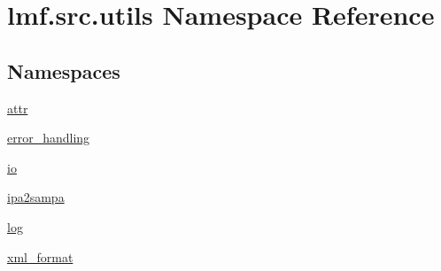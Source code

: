 \hypertarget{namespacelmf_1_1src_1_1utils}{\section{lmf.\+src.\+utils Namespace Reference}
\label{namespacelmf_1_1src_1_1utils}
}
\subsection*{Namespaces}
\begin{DoxyCompactItemize}
\item 
 \hyperlink{namespacelmf_1_1src_1_1utils_1_1attr}{attr}
\item 
 \hyperlink{namespacelmf_1_1src_1_1utils_1_1error__handling}{error\+\_\+handling}
\item 
 \hyperlink{namespacelmf_1_1src_1_1utils_1_1io}{io}
\item 
 \hyperlink{namespacelmf_1_1src_1_1utils_1_1ipa2sampa}{ipa2sampa}
\item 
 \hyperlink{namespacelmf_1_1src_1_1utils_1_1log}{log}
\item 
 \hyperlink{namespacelmf_1_1src_1_1utils_1_1xml__format}{xml\+\_\+format}
\end{DoxyCompactItemize}
